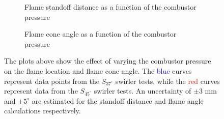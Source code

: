 \begin{figure}

\begin{subfigure}{\linewidth}
  \centering
  
  \caption{Flame standoff distance as a function of the combustor pressure}
  \label{fig:pressureDistance}
\end{subfigure}

\begin{subfigure}{\linewidth}
  \centering
  
  \caption{Flame cone angle as a function of the combustor pressure}
  \label{fig:pressureAngle}
\end{subfigure}

\caption[Effect of combustor pressure on the flame location and shape]{The plots above show the effect of varying the combustor pressure on the flame location and flame cone angle. The \textcolor{blue}{blue} curves represent data points from the \(S_{37^\circ}\) swirler tests, while the \textcolor{red}{red} curves represent data from the \(S_{45^\circ}\) swirler tests. An uncertainty of \(\pm 3\) mm and \(\pm 5^\circ\) are estimated for the standoff distance and flame angle calculations respectively.}

\label{fig:pressureResults}

\end{figure}


